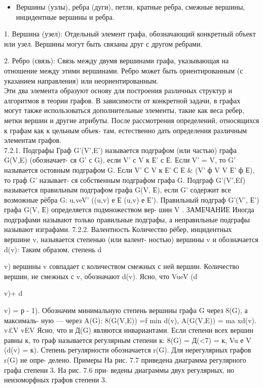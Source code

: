 \documentclass[
]{article}
\providecommand{\tightlist}{%
  \setlength{\itemsep}{0pt}\setlength{\parskip}{0pt}}
\begin{document}
\begin{enumerate}
  \begin{itemize}
  \tightlist
  \item
    Вершины (узлы), ребра (дуги), петли, кратные ребра, смежные вершины,
    инцидентные вершины и ребра.\\
  \end{itemize}

1. Вершина (узел): Отдельный элемент графа, обозначающий конкретный объект или узел. Вершины могут быть связаны друг с другом ребрами.

2. Ребро (связь): Связь между двумя вершинами графа, указывающая на отношение между этими вершинами. Ребро может быть ориентированным (с указанием направления) или неориентированным.\\
Эти два элемента образуют основу для построения различных структур и алгоритмов в теории графов. В зависимости от конкретной задачи, в графах могут также использоваться дополнительные элементы, такие как веса ребер, метки вершин и другие атрибуты.
После рассмотрения определений, относящихся к графам как к цельным объек-
там, естественно дать определения различным элементам графов.\\ 
7.2.1. Подграфы
Граф G'(V',E') называется подграфом (или частью) графа G(V,E) (обозначает-
ся G' с G), если V' с V к Е' с Е. Если V' = V, то G' называется остовным
подграфом G. Если V' С V к Е' С Е \& (V' ф V V Е' ф Е), то граф G' называет-
ся собственным подграфом графа G. Подграф G'(V',Ef) называется правильным
подграфом графа G(V, Е), если G' содержит все возможные рёбра G:
\/u,veV' ((u,v) е Е (u,v) е Е').
Правильный подграф G'(V', Е') графа G(V, Е) определяется подмножеством вер-
шин V .
ЗАМЕЧАНИЕ
Иногда подграфами называют только правильные подграфы, а неправильные подграфы
называют изграфами.
7.2.2. Валентность
Количество рёбер, инцидентных вершине v, называется степенью (или валент-
ностью) вершины v и обозначается d(v):
Таким образом, степень d{v) вершины v совпадает с количеством смежных с ней
вершин. Количество вершин, не смежных с v, обозначают d(v). Ясно, что
VueV (d{v)+ d{v) = р - 1).
Обозначим минимальную степень вершины графа G через 8(G), а максималь-
ную — через A(G):
8(G(V,E)) =f min d(v), A(G(V,E)) = ma xd(v).
v£V vEV
Ясно, что и Д(G) являются инвариантами. Если степени всех вершин равны
к, то граф называется регулярным степени к:
8(G) = Д(<7) = к, Vu е V (d(v) = к).
Степень регулярности обозначается r(G). Для нерегулярных графов r(G) не опре-
делено.
Примеры
На рис. 7.7 приведена диаграмма регулярного графа степени 3. На рис. 7.6 при-
ведены диаграммы двух регулярных, но неизоморфных графов степени 3.

}}}
\end{enumerate}
\end{document}
